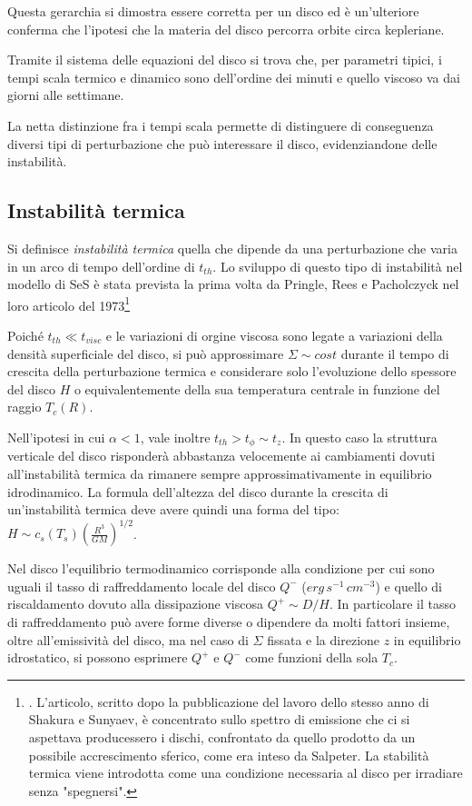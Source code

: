 \documentclass[a4paperbi]{article}
\begin{document}
	Questa gerarchia si dimostra essere corretta per un disco ed è un'ulteriore conferma che l'ipotesi che la materia del disco percorra orbite circa kepleriane.

	Tramite il sistema delle equazioni del disco si trova che, per parametri tipici, i tempi scala termico e dinamico sono dell'ordine dei minuti e quello viscoso va dai giorni alle settimane.

	La netta distinzione fra i tempi scala permette di distinguere di conseguenza diversi tipi di perturbazione che può interessare il disco, evidenziandone delle instabilità.
	
\subsection{Instabilità termica}
	Si definisce \textit{instabilità termica} quella che dipende da una perturbazione che varia in un arco di tempo dell'ordine di $t_{th}$. Lo sviluppo di questo tipo di instabilità nel modello di SeS è stata prevista la prima volta da Pringle, Rees e Pacholczyck nel loro articolo del 1973\footnote{\cite{PringleReesPacholczyk1973}. L'articolo, scritto dopo la pubblicazione del lavoro dello stesso anno di Shakura e Sunyaev, è concentrato sullo spettro di emissione che ci si aspettava producessero i dischi, confrontato da quello prodotto da un possibile accrescimento sferico, come era inteso da Salpeter. La stabilità termica viene introdotta come una condizione necessaria al disco per irradiare senza "spegnersi".}

	Poiché $t_{th}\ll t_{visc}$ e le variazioni di orgine viscosa sono legate a variazioni della densità superficiale del disco, si può approssimare $\Sigma\sim cost$ durante il tempo di crescita della perturbazione termica e considerare solo l'evoluzione dello spessore del disco $H$ o equivalentemente della sua temperatura centrale in funzione del raggio $T_c(R)$.
	
	Nell'ipotesi in cui $\alpha<1$, vale inoltre $t_{th}>t_\phi\sim t_z$. In questo caso la struttura verticale del disco risponderà abbastanza velocemente ai cambiamenti dovuti all'instabilità termica da rimanere sempre approssimativamente in equilibrio idrodinamico. La formula dell'altezza del disco durante la crescita di un'instabilità termica deve avere quindi una forma del tipo: $H\sim c_s(T_s)\left(\frac{R^3}{GM}\right)^{1/2}$.
	
	Nel disco l'equilibrio termodinamico corrisponde alla condizione per cui sono uguali il tasso di raffreddamento locale del disco $Q^-$ ($erg\,s^{-1}\,cm^{-3}$) e quello di riscaldamento dovuto alla dissipazione viscosa $Q^+\sim D/H$. In particolare il tasso di raffreddamento può avere forme diverse o dipendere da molti fattori insieme, oltre all'emissività del disco, ma nel caso di $\Sigma$ fissata e la direzione $z$ in equilibrio idrostatico, si possono esprimere $Q^+$ e $Q^-$ come funzioni della sola $T_c$. 
	
\end{document}
